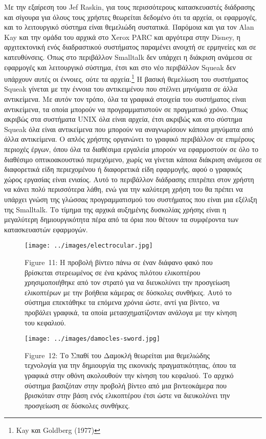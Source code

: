 \documentclass[
]{article}
\begin{document}
Με την εξαίρεση του Jef Raskin, για τους περισσότερους κατασκευαστές
διάδρασης και σίγουρα για όλους τους χρήστες θεωρείται δεδομένο ότι τα
αρχεία, οι εφαρμογές, και το λειτουργικό σύστημα είναι θεμελιώδη
συστατικά. Παρόμοια και για τον Alan Kay και την ομάδα του αρχικά στο
Xerox PARC και αργότερα στην Disney, η αρχιτεκτονική ενός διαδραστικού
συστήματος παραμένει ανοιχτή σε ερμηνείες και σε κατευθύνσεις. Όπως στο
περιβάλλον Smalltalk δεν υπάρχει η διάκριση ανάμεσα σε εφαρμογές και
λειτουργικό σύστημα, έτσι και στο νέο περιβάλλον Squeak δεν υπάρχουν
αυτές οι έννοιες, ούτε τα αρχεία.\footnote{Kay και Goldberg (1977)} Η
βασική θεμελίωση του συστήματος Squeak γίνεται με την έννοια του
αντικειμένου που στέλνει μηνύματα σε άλλα αντικείμενα. Με αυτόν τον
τρόπο, όλα τα γραφικά στοιχεία του συστήματος είναι αντικείμενα, τα
οποία μπορούν να προγραμματιστούν σε πραγματικό χρόνο. Όπως ακριβώς στα
συστήματα UNIX όλα είναι αρχεία, έτσι ακριβώς και στο σύστημα Squeak όλα
είναι αντικείμενα που μπορούν να αναγνωρίσουν κάποια μηνύματα από άλλα
αντικείμενα. Ο απλός χρήστης οργανώνει το γραφικό περιβάλλον σε
επιμέρους περιοχές έργων, όπου όλα τα διαθέσιμα εργαλεία μπορούν να
εφαρμοστούν σε όλο το διαθέσιμο οπτικοακουστικό περιεχόμενο, χωρίς να
γίνεται κάποια διάκριση ανάμεσα σε διαφορετικά είδη περιεχομένου ή
διαφορετικά είδη εφαρμογής, αφού ο γραφικός χώρος εργασίας είναι
ενιαίος. Αυτό το περιβάλλον διάδρασης επιτρέπει στον χρήστη να κάνει
πολύ περισσότερα λάθη, ενώ για την καλύτερη χρήση του θα πρέπει να
υπάρχει γνώση της γλώσσας προγραμματισμού του συστήματος που είναι μια
εξέλιξη της Smalltalk. Το τίμημα της αρχικά αυξημένης δυσκολίας χρήσης
είναι η μεγαλύτερη δημιουργικότητα πέρα από τα όρια που θέτουν τα
συμφέροντα των κατασκευαστών εφαρμογών.

\leavevmode{}%
\begin{figure}
\hypertarget{fig:electrocular}{%
\centering
\texttt{[image: ../images/electrocular.jpg]}
\caption{Figure~11: Η προβολή βίντεο πάνω σε έναν διάφανο φακό που
βρίσκεται στερεωμένος σε ένα κράνος πιλότου ελικοπτέρου χρησιμοποιήθηκε
από τον στρατό για να διευκολύνει την προσγείωση ελικοπτέρων με την
βοήθεια κάμερας σε δύσκολες συνθήκες. Αυτό το σύστημα επεκτάθηκε τα
επόμενα χρόνια ώστε, αντί για βίντεο, να προβάλει γραφικά, τα οποία
μετασχηματίζονταν ανάλογα με την κίνηση του
κεφαλιού.}\label{fig:electrocular}
}
\end{figure}

\leavevmode{}%
\begin{figure}
\hypertarget{fig:damocles-sword}{%
\centering
\texttt{[image: ../images/damocles-sword.jpg]}
\caption{Figure~12: Tο Σπαθί του Δαμοκλή θεωρείται μια θεμελιώδης
τεχνολογία για την δημιουργία της εικονικής πραγματικότητας, όπου τα
γραφικά στην οθόνη ακολουθούν την κίνηση του κεφαλιού. Το αρχικό σύστημα
βασιζόταν στην προβολή βίντεο από μια βιντεοκάμερα που βρισκόταν στην
βάση ενός ελικοπτέρου έτσι ώστε να διευκολύνει την προσγείωση σε
δύσκολες συνθήκες.}\label{fig:damocles-sword}
}
\end{figure}
\end{document}

